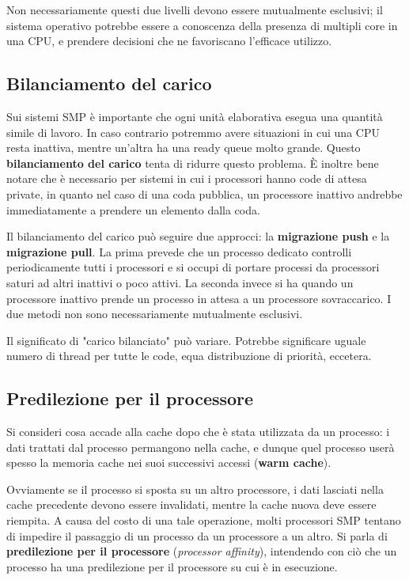         Non necessariamente questi due livelli devono essere mutualmente esclusivi; il sistema operativo potrebbe essere a conoscenza della presenza di multipli core in una CPU, e prendere decisioni che ne favoriscano l'efficace utilizzo.
        
    \subsection{Bilanciamento del carico}
        Sui sistemi SMP è importante che ogni unità elaborativa esegua una quantità simile di lavoro. In caso contrario potremmo avere situazioni in cui una CPU resta inattiva, mentre un'altra ha una ready queue molto grande. Questo \textbf{bilanciamento del carico} tenta di ridurre questo problema. È inoltre bene notare che è necessario per sistemi in cui i processori hanno code di attesa private, in quanto nel caso di una coda pubblica, un processore inattivo andrebbe immediatamente a prendere un elemento dalla coda.
            
        Il bilanciamento del carico può seguire due approcci: la \textbf{migrazione push} e la \textbf{migrazione pull}. La prima prevede che un processo dedicato controlli periodicamente tutti i processori e si occupi di portare processi da processori saturi ad altri inattivi o poco attivi. La seconda invece si ha quando un processore inattivo prende un processo in attesa a un processore sovraccarico. I due metodi non sono necessariamente mutualmente esclusivi.
            
        Il significato di "carico bilanciato" può variare. Potrebbe significare uguale numero di thread per tutte le code, equa distribuzione di priorità, eccetera.
            
    \subsection{Predilezione per il processore}
        Si consideri cosa accade alla cache dopo che è stata utilizzata da un processo: i dati trattati dal processo permangono nella cache, e dunque quel processo userà spesso la memoria cache nei suoi successivi accessi (\textbf{warm cache}).
            
        Ovviamente se il processo si sposta su un altro processore, i dati lasciati nella cache precedente devono essere invalidati, mentre la cache nuova deve essere riempita. A causa del costo di una tale operazione, molti processori SMP tentano di impedire il passaggio di un processo da un processore a un altro. Si parla di \textbf{predilezione per il processore} (\textit{processor affinity}), intendendo con ciò che un processo ha una predilezione per il processore su cui è in esecuzione.
            
